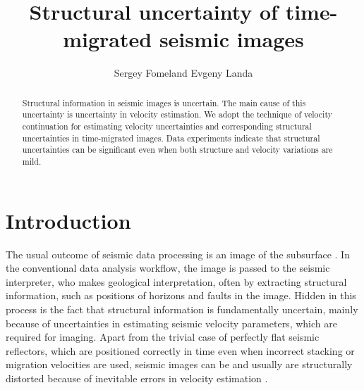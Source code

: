 
\title{Structural uncertainty of time-migrated seismic images}

\renewcommand{\thefootnote}{\fnsymbol{footnote}}

\author{Sergey Fomel\footnotemark[1] and Evgeny Landa\footnotemark[2]}

\address{
\footnotemark[1]Bureau of Economic Geology, \\
Jackson School of Geosciences \\
The University of Texas at Austin \\
University Station, Box X \\
Austin, TX 78713-8924 \\
USA \\
\footnotemark[2]OPERA \\
Bat. IFR, Rue Jules Ferry \\
64000 Pau \\
France}

\maketitle

\begin{abstract}
  Structural information in seismic images is uncertain. The main
  cause of this uncertainty is uncertainty in velocity
  estimation. We adopt the technique of velocity continuation for
  estimating velocity uncertainties and corresponding structural
  uncertainties in time-migrated images. Data experiments indicate
  that structural uncertainties can be significant even when both
  structure and velocity variations are mild.
\end{abstract}


\section{Introduction}

The usual outcome of seismic data processing is an image of the
subsurface \cite[]{yilmaz}. In the conventional data analysis
workflow, the image is passed to the seismic interpreter, who makes
geological interpretation, often by extracting structural information,
such as positions of horizons and faults in the image. Hidden in this
process is the fact that structural information is fundamentally
uncertain, mainly because of uncertainties in estimating seismic
velocity parameters, which are required for imaging. Apart from the
trivial case of perfectly flat seismic reflectors, which are positioned
correctly in time even when incorrect stacking or migration
velocities are used, seismic images can be and usually are structurally
distorted because of inevitable errors in velocity estimation
\cite[]{hamburg}.

